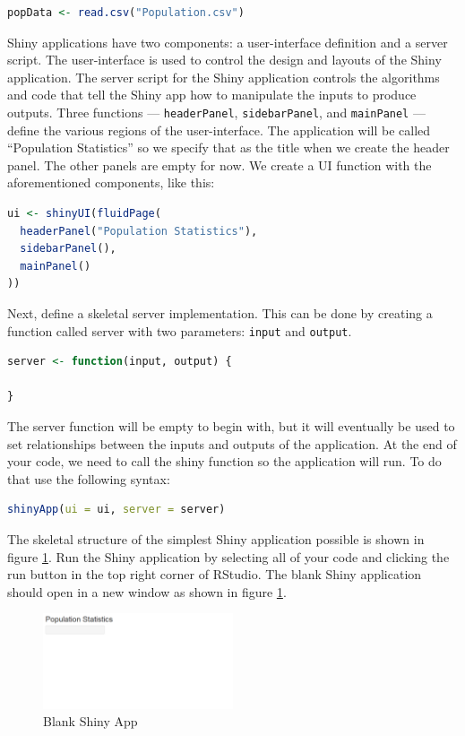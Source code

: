 \begin{lstlisting}[language = R]
popData <- read.csv("Population.csv")
\end{lstlisting}
Shiny applications have two components: a user-interface definition and a server script.
The user-interface is used to control the design and layouts of the Shiny application.
The server script for the Shiny application controls the algorithms and code that tell the Shiny app how to manipulate the inputs to produce outputs.\cite{shiny} 
Three functions --- \texttt{headerPanel}, \texttt{sidebarPanel}, and \texttt{mainPanel} --- define the various regions of the user-interface.
The application will be called ``Population Statistics'' so we specify that as the title when we create the header panel.
The other panels are empty for now.
We create a UI function with the aforementioned components, like this:
\begin{lstlisting}[language = R]
ui <- shinyUI(fluidPage(
  headerPanel("Population Statistics"),
  sidebarPanel(),
  mainPanel()
))
\end{lstlisting}
Next, define a skeletal server implementation.
This can be done by creating a function called server with two parameters: \texttt{input} and \texttt{output}.
\begin{lstlisting}[language = R]
server <- function(input, output) {

}
\end{lstlisting}
The server function will be empty to begin with, but it will eventually be used to set relationships between the inputs and outputs of the application.
At the end of your code, we need to call the shiny function so the application will run.
To do that use the following syntax: 
\begin{lstlisting}[language = R]
shinyApp(ui = ui, server = server)
\end{lstlisting}
The skeletal structure of the simplest Shiny application possible is shown in figure \ref{fig:blank}. 
Run the Shiny application by selecting all of your code and clicking the run button in the top right corner of RStudio.
The blank Shiny application should open in a new window as shown in figure \ref{fig:blank}.
\begin{figure}[htbp!]
   \centering
   \includegraphics[width=0.5\textwidth]{pictures/shiny/blank.PNG} 
   \caption{Blank Shiny App}
   \label{fig:blank}
\end{figure}

